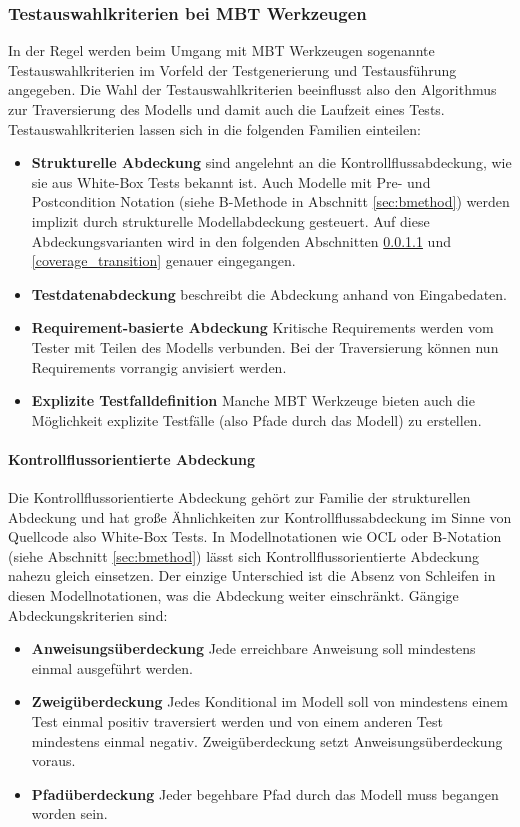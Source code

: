 \subsubsection{Testauswahlkriterien bei \Gls{MBT} Werkzeugen}
In der Regel werden beim Umgang mit \Gls{MBT} Werkzeugen sogenannte Testauswahlkriterien im Vorfeld der Testgenerierung und Testausführung angegeben. Die Wahl der Testauswahlkriterien beeinflusst also den Algorithmus zur Traversierung des Modells und damit auch die Laufzeit eines Tests.\\
Testauswahlkriterien lassen sich in die folgenden Familien einteilen:

\begin{itemize}
\item \textbf{Strukturelle Abdeckung} sind angelehnt an die Kontrollflussabdeckung, wie sie aus White-Box Tests bekannt ist. Auch Modelle mit Pre- und Postcondition Notation (siehe B-Methode in Abschnitt \ref{sec:bmethod}) werden implizit durch strukturelle Modellabdeckung gesteuert. Auf diese Abdeckungsvarianten wird in den folgenden Abschnitten \ref{coverage_control}  und \ref{coverage_transition}  genauer eingegangen.
\item \textbf{Testdatenabdeckung} beschreibt die Abdeckung anhand von Eingabedaten.
\item \textbf{Requirement-basierte Abdeckung} Kritische Requirements werden vom Tester mit Teilen des Modells verbunden. Bei der Traversierung können nun Requirements vorrangig anvisiert werden.
\item \textbf{Explizite Testfalldefinition} Manche \Gls{MBT} Werkzeuge bieten auch die Möglichkeit explizite Testfälle (also Pfade durch das Modell) zu erstellen.
\end{itemize}

\paragraph{Kontrollflussorientierte Abdeckung}\label{coverage_control} Die Kontrollflussorientierte Abdeckung gehört zur Familie der strukturellen Abdeckung und hat große Ähnlichkeiten zur Kontrollflussabdeckung im Sinne von Quellcode also White-Box Tests. In Modellnotationen wie OCL\cite{warmer_object_2004} oder B-Notation (siehe Abschnitt \ref{sec:bmethod}) lässt sich Kontrollflussorientierte Abdeckung nahezu gleich einsetzen. Der einzige Unterschied ist die Absenz von Schleifen in diesen Modellnotationen, was die Abdeckung weiter einschränkt. Gängige Abdeckungskriterien sind\cite{rossner_basiswissen_2010}:
\begin{itemize}
\item \textbf{Anweisungsüberdeckung} Jede erreichbare Anweisung soll mindestens einmal ausgeführt werden.
\item \textbf{Zweigüberdeckung} Jedes Konditional im Modell soll von mindestens einem Test einmal positiv traversiert werden und von einem anderen Test mindestens einmal negativ. Zweigüberdeckung setzt Anweisungsüberdeckung voraus.
\item \textbf{Pfadüberdeckung} Jeder begehbare Pfad durch das Modell muss begangen worden sein.
\end{itemize}

